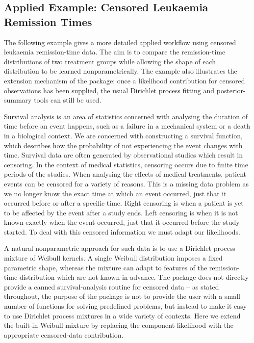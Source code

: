 \documentclass[nojss]{jss}
\begin{document}
\subsection{Applied Example: Censored Leukaemia Remission Times}
\label{subsec:censored}
The following example gives a more detailed applied workflow using censored leukaemia remission-time data. The aim is to compare the remission-time distributions of two treatment groups while allowing the shape of each distribution to be learned nonparametrically. The example also illustrates the extension mechanism of the  package: once a likelihood contribution for censored observations has been supplied, the usual Dirichlet process fitting and posterior-summary tools can still be used.

Survival analysis is an area of statistics concerned with analysing the duration of time before an event happens, such as a failure in a mechanical system or a death in a biological context. We are concerned with constructing a survival function, which describes how the probability of not experiencing the event changes with time. Survival data are often generated by observational studies which result in censoring. In the context of medical statistics, censoring occurs due to finite time periods of the studies. When analysing the effects of medical treatments, patient events can be censored for a variety of reasons. This is a missing data problem as we no longer know the exact time at which an event occurred, just that it occurred before or after a specific time. Right censoring is when a patient is yet to be affected by the event after a study ends. Left censoring is when it is not known exactly when the event occurred, just that it occurred before the study started. To deal with this censored information we must adapt our likelihoods.

A natural nonparametric approach for such data is to use a Dirichlet process mixture of Weibull kernels. A single Weibull distribution imposes a fixed parametric shape, whereas the mixture can adapt to features of the remission-time distribution which are not known in advance. The  package does not directly provide a canned survival-analysis routine for censored data -- as stated throughout, the purpose of the package is not to provide the user with a small number of functions for solving predefined problems, but instead to make it easy to use Dirichlet process mixtures in a wide variety of contexts. Here we extend the built-in Weibull mixture by replacing the component likelihood with the appropriate censored-data contribution.
\end{document}
